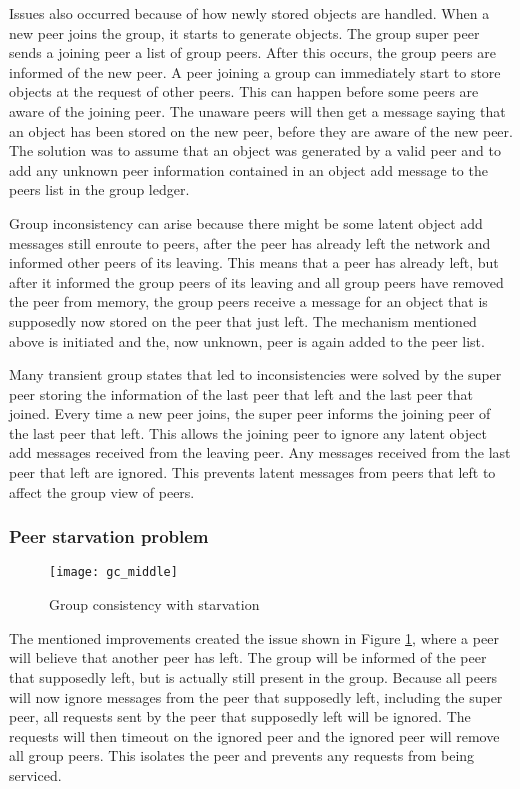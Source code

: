 Issues also occurred because of how newly stored objects are handled. When a new peer joins the group, it starts to generate objects. The group super peer sends a joining peer a list of group peers. After this occurs, the group peers are informed of the new peer. A peer joining a group can immediately start to store objects at the request of other peers. This can happen before some peers are aware of the joining peer. The unaware peers will then get a message saying that an object has been stored on the new peer, before they are aware of the new peer. The solution was to assume that an object was generated by a valid peer and to add any unknown peer information contained in an object add message to the peers list in the group ledger.

Group inconsistency can arise because there might be some latent object add messages still enroute to peers, after the peer has already left the network and informed other peers of its leaving. This means that a peer has already left, but after it informed the group peers of its leaving and all group peers have removed the peer from memory, the group peers receive a message for an object that is supposedly now stored on the peer that just left. The mechanism mentioned above is initiated and the, now unknown, peer is again added to the peer list.

Many transient group states that led to inconsistencies were solved by the super peer storing the information of the last peer that left and the last peer that joined. Every time a new peer joins, the super peer informs the joining peer of the last peer that left. This allows the joining peer to ignore any latent object add messages received from the leaving peer. Any messages received from the last peer that left are ignored. This prevents latent messages from peers that left to affect the group view of peers.

\subsubsection{Peer starvation problem}
\begin{figure}[htbp]
 \centering
 \texttt{[image: gc\_middle]}
 \caption{Group consistency with starvation}
 \label{fig_gc_middle}
\end{figure}
%
The mentioned improvements created the issue shown in Figure \ref{fig_gc_middle}, where a peer will believe that another peer has left. The group will be informed of the peer that supposedly left, but is actually still present in the group. Because all peers will now ignore messages from the peer that supposedly left, including the super peer, all requests sent by the peer that supposedly left will be ignored. The requests will then timeout on the ignored peer and the ignored peer will remove all group peers. This isolates the peer and prevents any requests from being serviced.

